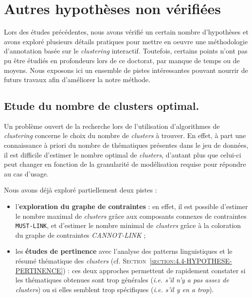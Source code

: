 \section{Autres hypothèses non vérifiées}
\label{section:4.7-HYPOTHESES-NON-VERIFIEES}

	Lors des études précédentes, nous avons vérifié un certain nombre d'hypothèses et avons exploré plusieurs détails pratiques pour mettre en oeuvre une méthodologie d'annotation basée sur le \textit{clustering} interactif.
	Toutefois, certains points n'ont pas pu être étudiés en profondeurs lors de ce doctorat, par manque de temps ou de moyens.
	Nous exposons ici un ensemble de pistes intéressantes pouvant nourrir de futurs travaux afin d'améliorer la notre méthode.
	
	
	\subsection{Etude du nombre de clusters optimal.}
	\label{section:4.7.1-HYPOTHESES-NON-VERIFIEES-NOMBRE-CLUSTERS}
	
		Un problème ouvert de la recherche lors de l'utilisation d'algorithmes de \textit{clustering} concerne le choix du nombre de \textit{clusters} à trouver.
		En effet, à part une connaissance à priori du nombre de thématiques présentes dans le jeu de données, il est difficile d'estimer le nombre optimal de \textit{clusters}, d'autant plus que celui-ci peut changer en fonction de la granularité de modélisation requise pour répondre au cas d'usage.
		
		Nous avons déjà exploré partiellement deux pistes :
		\begin{itemize}
			\item l'\textbf{exploration du graphe de contraintes} : en effet, il est possible d'estimer le nombre maximal de \textit{clusters} grâce aux composants connexes de contraintes \texttt{MUST-LINK}, et d'estimer le nombre minimal de \textit{clusters} grâce à la coloration du graphe de contraintes \textit{CANNOT-LINK} ;
			\item les \textbf{études de pertinence} avec l'analyse des patterns linguistiques et le résumé thématique des \textit{clusters} (cf. \textsc{Section~\ref{section:4.4-HYPOTHESE-PERTINENCE}}) : ces deux approches permettent de rapidement constater si les thématiques obtenues sont trop générales (\textit{i.e. s'il n'y a pas assez de clusters}) ou si elles semblent trop spécifiques (\textit{i.e. s'il y en a trop}).
		\end{itemize}
		
